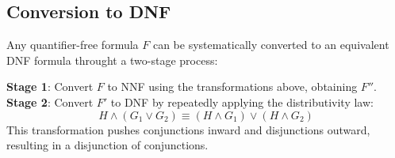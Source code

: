 \documentclass[a4paper]{article}
\theoremstyle{definition}
\begin{document}
\subsection{Conversion to DNF}
Any quantifier-free formula \( F \) can be systematically converted to an equivalent DNF formula throught a two-stage 
process:
\begin{center}
\end{center}
\textbf{Stage 1}: Convert \( F \) to NNF using the transformations above, obtaining \( F'' \).
\vspace{1em}
\noindent
\newline
\textbf{Stage 2}: Convert \( F' \) to DNF by repeatedly applying the distributivity law:
\[
  H \wedge (G_1 \vee G_2) \equiv (H \wedge G_1) \vee (H \wedge G_2)
\]
This transformation pushes conjunctions inward and disjunctions outward,
resulting in a disjunction of conjunctions.
\end{document}
